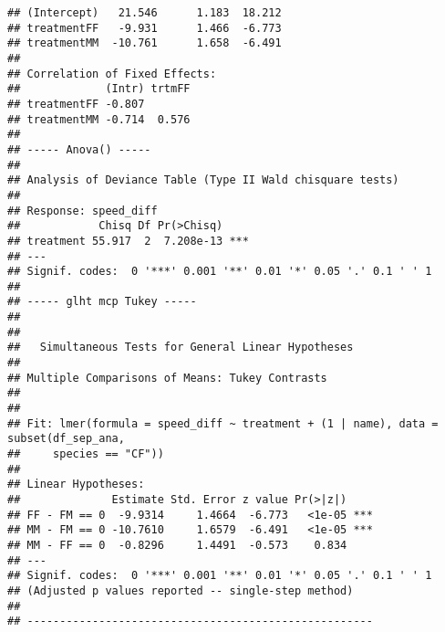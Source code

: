 \documentclass[
]{article}
\begin{document}
\begin{verbatim}
## (Intercept)   21.546      1.183  18.212
## treatmentFF   -9.931      1.466  -6.773
## treatmentMM  -10.761      1.658  -6.491
## 
## Correlation of Fixed Effects:
##             (Intr) trtmFF
## treatmentFF -0.807       
## treatmentMM -0.714  0.576
## 
## ----- Anova() -----
## 
## Analysis of Deviance Table (Type II Wald chisquare tests)
## 
## Response: speed_diff
##            Chisq Df Pr(>Chisq)    
## treatment 55.917  2  7.208e-13 ***
## ---
## Signif. codes:  0 '***' 0.001 '**' 0.01 '*' 0.05 '.' 0.1 ' ' 1
## 
## ----- glht mcp Tukey -----
## 
## 
##   Simultaneous Tests for General Linear Hypotheses
## 
## Multiple Comparisons of Means: Tukey Contrasts
## 
## 
## Fit: lmer(formula = speed_diff ~ treatment + (1 | name), data = subset(df_sep_ana, 
##     species == "CF"))
## 
## Linear Hypotheses:
##              Estimate Std. Error z value Pr(>|z|)    
## FF - FM == 0  -9.9314     1.4664  -6.773   <1e-05 ***
## MM - FM == 0 -10.7610     1.6579  -6.491   <1e-05 ***
## MM - FF == 0  -0.8296     1.4491  -0.573    0.834    
## ---
## Signif. codes:  0 '***' 0.001 '**' 0.01 '*' 0.05 '.' 0.1 ' ' 1
## (Adjusted p values reported -- single-step method)
## 
## -----------------------------------------------------
\end{verbatim}
\end{document}
